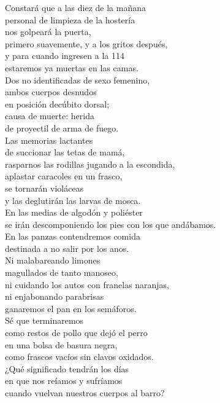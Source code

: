 

Constará que a las diez de la mañana\\
personal de limpieza de la hostería\\
nos golpeará la puerta,\\
primero suavemente, y a los gritos después,\\
y para cuando ingresen a la 114\\
estaremos ya muertas en las camas.\\
Dos no identificadas de sexo femenino,\\
ambos cuerpos desnudos\\
en posición decúbito dorsal;\\
causa de muerte: herida\\
de proyectil de arma de fuego.\\
Las memorias lactantes\\
de succionar las tetas de mamá,\\
rasparnos las rodillas jugando a la escondida,\\
aplastar caracoles en un frasco,\\
se tornarán violáceas\\
y las deglutirán las larvas de mosca.\\
En las medias de algodón y poliéster\\
se irán descomponiendo los pies con los que andábamos.\\
En las panzas contendremos comida\\
destinada a no salir por los anos.\\
Ni malabareando limones\\
magullados de tanto manoseo,\\
ni cuidando los autos con franelas naranjas,\\
ni enjabonando parabrisas\\
ganaremos el pan en los semáforos.\\
Sé que terminaremos\\
como restos de pollo que dejó el perro\\
en una bolsa de basura negra,\\
como frascos vacíos sin clavos oxidados.\\
¿Qué significado tendrán los días\\
en que nos reíamos y sufríamos\\
cuando vuelvan nuestros cuerpos al barro?\\

